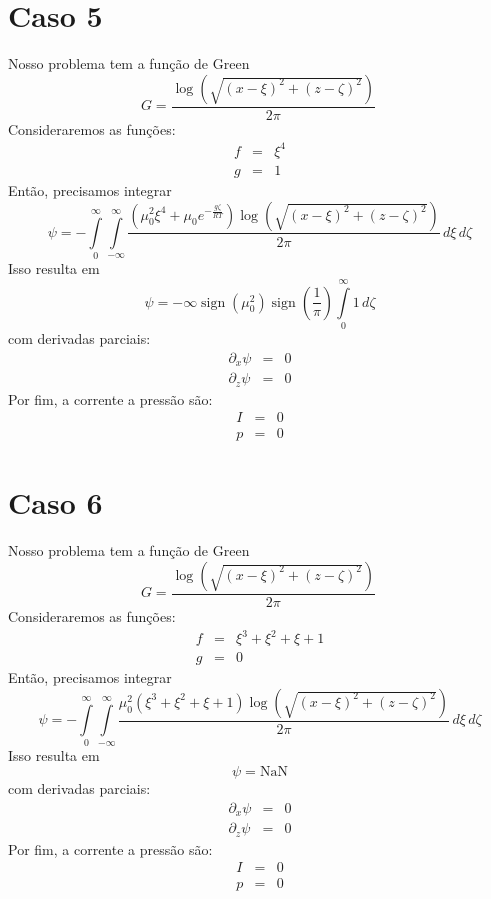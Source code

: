 \documentclass[12pt]{article}
\def\be{\begin{equation}}
\def\ee{\end{equation}}
\def\bea{\begin{eqnarray*}}
\def\eea{\end{eqnarray*}}
\theoremstyle{definition}
\numberwithin{equation}{section}
\begin{document}
        \section{Caso 5}
        Nosso problema tem a função de Green
        \be
            G = \frac{\log{\left(\sqrt{\left(x - \xi\right)^{2} + \left(z - \zeta\right)^{2}} \right)}}{2 \pi}\
        \ee
        Consideraremos as funções:
        \bea
            f &=& \xi^{4} \\
            g &=& 1
        \eea
        Então, precisamos integrar
        \be
            \psi = - \int\limits_{0}^{\infty}\int\limits_{-\infty}^{\infty} \frac{\left(\mu_{0}^{2} \xi^{4} + \mu_{0} e^{- \frac{g \zeta}{R T}}\right) \log{\left(\sqrt{\left(x - \xi\right)^{2} + \left(z - \zeta\right)^{2}} \right)}}{2 \pi}\, d\xi\, d\zeta
        \ee
        Isso resulta em
        \be
            \psi = - \infty \operatorname{sign}{\left(\mu_{0}^{2} \right)} \operatorname{sign}{\left(\frac{1}{\pi} \right)} \int\limits_{0}^{\infty} 1\, d\zeta
        \ee
        com derivadas parciais:
        \bea
            \partial_x\psi &=& 0 \\
            \partial_z\psi &=& 0
        \eea
        Por fim, a corrente a pressão são:
        \bea
            I &=& 0 \\
            p &=& 0
        \eea
        

        \section{Caso 6}
        Nosso problema tem a função de Green
        \be
            G = \frac{\log{\left(\sqrt{\left(x - \xi\right)^{2} + \left(z - \zeta\right)^{2}} \right)}}{2 \pi}\
        \ee
        Consideraremos as funções:
        \bea
            f &=& \xi^{3} + \xi^{2} + \xi + 1 \\
            g &=& 0
        \eea
        Então, precisamos integrar
        \be
            \psi = - \int\limits_{0}^{\infty}\int\limits_{-\infty}^{\infty} \frac{\mu_{0}^{2} \left(\xi^{3} + \xi^{2} + \xi + 1\right) \log{\left(\sqrt{\left(x - \xi\right)^{2} + \left(z - \zeta\right)^{2}} \right)}}{2 \pi}\, d\xi\, d\zeta
        \ee
        Isso resulta em
        \be
            \psi = \text{NaN}
        \ee
        com derivadas parciais:
        \bea
            \partial_x\psi &=& 0 \\
            \partial_z\psi &=& 0
        \eea
        Por fim, a corrente a pressão são:
        \bea
            I &=& 0 \\
            p &=& 0
        \eea
        
\end{document}
